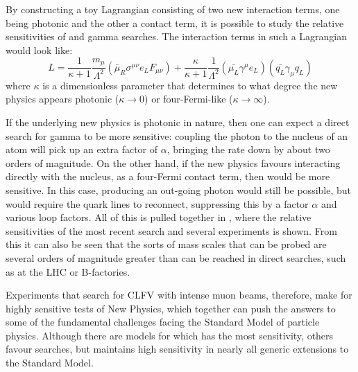 By constructing a toy Lagrangian consisting of two new interaction terms, one being photonic and the other a contact term, it is possible to study the relative sensitivities of \mueconv and \mutoe gamma searches.
The interaction terms in such a Lagrangian would look like:
\begin{equation}
L=\frac{1}{\kappa+1}\frac{m_\mu}{\Lambda^2}\left(\bar{\mu}_R\sigma^{\mu\nu}e_LF_{\mu\nu}\right)+\frac{\kappa}{\kappa+1}\frac{1}{\Lambda^2}\left(\bar{\mu_L}\gamma^\mu e_L\right)\left(\bar{q_L}\gamma_\mu q_L\right)
\end{equation}
where $\kappa$ is a dimensionless parameter that determines to what degree the new physics appears photonic ($\kappa\rightarrow0$) or four-Fermi-like ($\kappa\rightarrow\infty$).

If the underlying new physics is photonic in nature, then one can expect a direct search for \mutoe gamma to be more sensitive: coupling the photon to the nucleus of an atom will pick up an extra factor of $\alpha$, bringing the rate down by about two orders of magnitude.
On the other hand, if the new physics favours interacting directly with the nucleus, as a four-Fermi contact term, then \mueconv would be more sensitive. 
In this case, producing an out-going photon would still be possible, but would require the quark lines to reconnect, suppressing this by a factor $\alpha$ and various loop factors.
All of this is pulled together in , where the relative sensitivities of the most recent \muegamma search and several \mueconv experiments is shown.
From this it can also be seen that the sorts of mass scales that can be probed are several orders of magnitude greater than can be reached in direct searches, such as at the LHC or B-factories.

Experiments that search for \ac{CLFV} with intense muon beams, therefore, make for highly sensitive tests of New Physics, which together can push the answers to some of the fundamental challenges facing the Standard Model of particle physics.
Although there are models for which \mueconv has the most sensitivity, others favour \mueg searches, but \mueconv maintains high sensitivity in nearly all generic extensions to the Standard Model.
